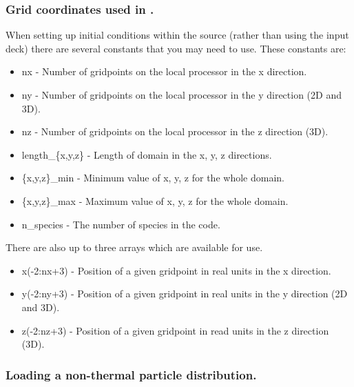 \subsubsection{Grid coordinates used in {\EPOCH}.}

When setting up initial conditions within the {\EPOCH} source (rather than
using the input deck)
there are several constants that you may need to use. These constants are:
\begin{itemize}
\item nx - Number of gridpoints on the local processor in the x direction.
\item ny - Number of gridpoints on the local processor in the y direction (2D
  and 3D).
\item nz - Number of gridpoints on the local processor in the z direction (3D).
\item length\_\{x,y,z\} - Length of domain in the x, y, z directions.
\item \{x,y,z\}\_min - Minimum value of x, y, z for the whole domain.
\item \{x,y,z\}\_max - Maximum value of x, y, z for the whole domain.
\item n\_species - The number of species in the code.
\end{itemize}

There are also up to three arrays which are available for use.
\begin{itemize}
\item x(-2:nx+3) - Position of a given gridpoint in real units in the x
  direction.
\item y(-2:ny+3) - Position of a given gridpoint in real units in the y
  direction (2D and 3D).
\item z(-2:nz+3) - Position of a given gridpoint in read units in the z
  direction (3D).
\end{itemize}

\subsubsection{Loading a non-thermal particle distribution.}

